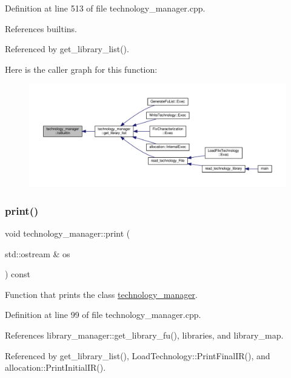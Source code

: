Definition at line 513 of file technology\+\_\+manager.\+cpp.



References builtins.



Referenced by get\+\_\+library\+\_\+list().

Here is the caller graph for this function\+:
\nopagebreak
\begin{figure}[H]
\begin{center}
\leavevmode
\includegraphics[width=350pt]{df/dc7/classtechnology__manager_a32b1731a83b59180ae9eadb890b99486_icgraph}
\end{center}
\end{figure}
\mbox{\label{classtechnology__manager_a945cc92ea4b049fa9e973981a7a1dc9f}} 
\subsubsection{\texorpdfstring{print()}{print()}}
{\footnotesize\ttfamily void technology\+\_\+manager\+::print (\begin{DoxyParamCaption}\item[{std\+::ostream \&}]{os }\end{DoxyParamCaption}) const}



Function that prints the class \hyperlink{classtechnology__manager}{technology\+\_\+manager}. 



Definition at line 99 of file technology\+\_\+manager.\+cpp.



References library\+\_\+manager\+::get\+\_\+library\+\_\+fu(), libraries, and library\+\_\+map.



Referenced by get\+\_\+library\+\_\+list(), Load\+Technology\+::\+Print\+Final\+I\+R(), and allocation\+::\+Print\+Initial\+I\+R().

